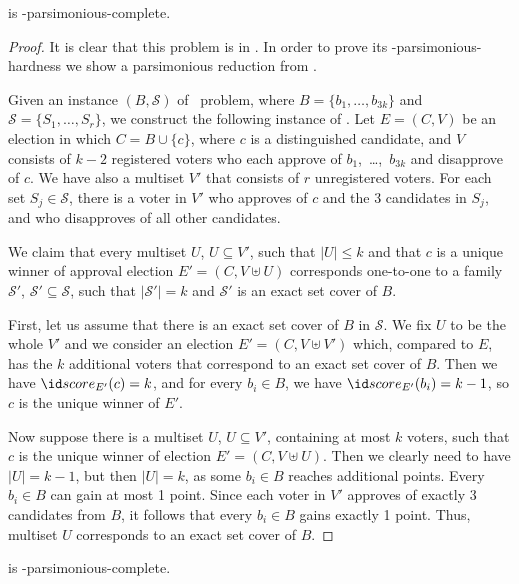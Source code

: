 \begin{theorem} \label{th:apavc}
	 is \sharpPclass-parsimonious-complete.
\end{theorem}

\begin{proof}
It is clear that this problem is in \sharpPclass.
In order to prove its \sharpPclass-parsimonious-hardness we show a parsimonious reduction from \sharpXthreeC.

Given an instance $(B,\mathcal{S})$ of \sharpXthreeC\ problem, where $B=\{b_1,\dots,b_{3k}\}$ and $\mathcal{S}=\{S_1,\dots,S_r\}$, we construct the following instance of .
Let $E=(C,V)$ be an election in which $C=B\cup\{c\}$, where $c$ is a distinguished candidate, and $V$ consists of $k-2$ registered voters who each approve of $b_1$,~\dots,~$b_{3k}$ and disapprove of $c$.
We have also a multiset $V'$ that consists of $r$ unregistered voters.
For each set $S_j\in\mathcal{S}$, there is a voter in $V'$ who approves of $c$ and the 3 candidates in $S_j$, and who disapproves of all other candidates.

We claim that every multiset $U$, $U\subseteq V'$, such that $|U|\le k$ and that $c$ is a unique winner of approval election $E'=(C,V\uplus U)$ corresponds one-to-one to a family $\mathcal{S'}$, $\mathcal{S'}\subseteq\mathcal{S}$, such that $|\mathcal{S'}|=k$ and $\mathcal{S'}$ is an exact set cover of $B$.

First, let us assume that there is an exact set cover of $B$ in $\mathcal{S}$.
We fix $U$ to be the whole $V'$ and we consider an election $E'=(C,V\uplus V')$ which, compared to $E$, has the $k$ additional voters that correspond to an exact set cover of $B$.
Then we have $\score{E'}(c)=k$, and for every $b_i\in B$, we have $\score{E'}(b_i)=k-1$, so $c$ is the unique winner of $E'$.

Now suppose there is a multiset $U$, $U\subseteq V'$, containing at most $k$ voters, such that $c$ is the unique winner of election $E'=(C,V\uplus U)$.
Then we clearly need to have $|U|=k-1$, but then $|U|=k$, as some $b_i\in B$ reaches additional points.
Every $b_i\in B$ can gain at most 1 point.
Since each voter in $V'$ approves of exactly 3 candidates from $B$, it follows that every $b_i\in B$ gains exactly 1 point.
Thus, multiset $U$ corresponds to an exact set cover of $B$.
\end{proof}

\begin{theorem} \label{th:cdavc}
	 is \sharpPclass-parsimonious-complete.
\end{theorem}

